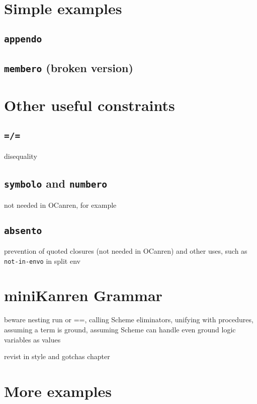 \documentclass{book}
\begin{document}
\section{Simple examples}

\subsection{\texttt{appendo}}

\subsection{\texttt{membero} (broken version)}

\section{Other useful constraints}

\subsection{\texttt{=/=}}

disequality

\subsection{\texttt{symbolo} and \texttt{numbero}}

not needed in OCanren, for example

\subsection{\texttt{absento}}

prevention of quoted closures (not needed in OCanren) and other uses,
such as \texttt{not-in-envo} in split env

\section{miniKanren Grammar}

beware nesting run or ==, calling Scheme eliminators, unifying with procedures, assuming a term is ground, assuming Scheme can handle even ground logic variables as values

revist in style and gotchas chapter

\section{More examples}
\end{document}
